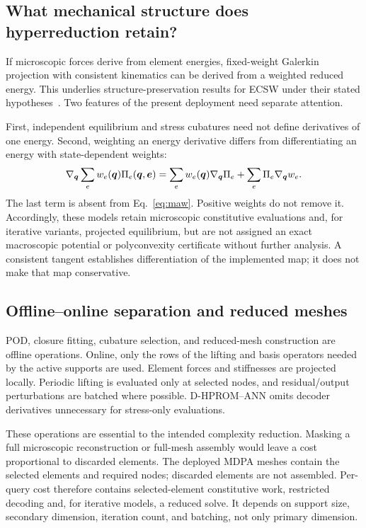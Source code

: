 \subsection{What mechanical structure does hyperreduction retain?}
If microscopic forces derive from element energies, fixed-weight Galerkin projection with consistent kinematics can be derived from a weighted reduced energy. This underlies structure-preservation results for ECSW under their stated hypotheses~\cite{farhat2015}. Two features of the present deployment need separate attention.

First, independent equilibrium and stress cubatures need not define derivatives of one energy. Second, weighting an energy derivative differs from differentiating an energy with state-dependent weights:
\begin{equation}
 \nabla_{\bm q}\sum_e w_e(\bm q)\Pi_e(\bm q,\bm e)
 =
 \sum_e w_e(\bm q)\nabla_{\bm q}\Pi_e
 +\sum_e\Pi_e\nabla_{\bm q}w_e .
 \label{eq:weight_energy_difference}
\end{equation}
The last term is absent from Eq.~\eqref{eq:maw}. Positive weights do not remove it. Accordingly, these models retain microscopic constitutive evaluations and, for iterative variants, projected equilibrium, but are not assigned an exact macroscopic potential or polyconvexity certificate without further analysis. A consistent tangent establishes differentiation of the implemented map; it does not make that map conservative.

\subsection{Offline--online separation and reduced meshes}
POD, closure fitting, cubature selection, and reduced-mesh construction are offline operations. Online, only the rows of the lifting and basis operators needed by the active supports are used. Element forces and stiffnesses are projected locally. Periodic lifting is evaluated only at selected nodes, and residual/output perturbations are batched where possible. D-HPROM--ANN omits decoder derivatives unnecessary for stress-only evaluations.

These operations are essential to the intended complexity reduction. Masking a full microscopic reconstruction or full-mesh assembly would leave a cost proportional to discarded elements. The deployed MDPA meshes contain the selected elements and required nodes; discarded elements are not assembled. Per-query cost therefore contains selected-element constitutive work, restricted decoding and, for iterative models, a reduced solve. It depends on support size, secondary dimension, iteration count, and batching, not only primary dimension.

